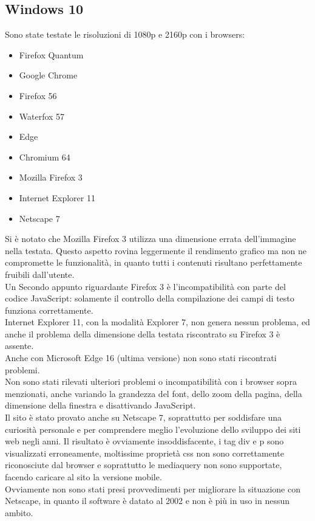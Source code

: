 \documentclass[openany, a4paper, 12pt]{report}
\begin{document}
				\subsection{Windows 10}
				Sono state testate le risoluzioni di 1080p e 2160p con i browsers:
				\begin{itemize}
					\item Firefox Quantum
					\item Google Chrome
					\item Firefox 56
					\item Waterfox 57
					\item Edge
					\item Chromium 64
					\item Mozilla Firefox 3
					\item Internet Explorer 11
					\item Netscape 7
				\end{itemize}
				Si è notato che Mozilla Firefox 3 utilizza una dimensione errata dell'immagine nella testata. Questo aspetto rovina leggermente il rendimento grafico ma non ne compromette le funzionalità, in quanto tutti i contenuti risultano perfettamente fruibili dall'utente.\\
				Un Secondo appunto riguardante Firefox 3 è l'incompatibilità con parte del codice JavaScript: solamente il controllo della compilazione dei campi di testo funziona correttamente.\\
				Internet Explorer 11, con la modalità Explorer 7, non genera nessun problema, ed anche il problema della dimensione della testata riscontrato su Firefox 3  è assente.\\
				Anche con Microsoft Edge 16 (ultima versione) non sono stati riscontrati problemi. \\
				Non sono stati rilevati ulteriori problemi o incompatibilità con i browser sopra menzionati, anche variando la grandezza del font, dello zoom della pagina, della dimensione della finestra e disattivando JavaScript.\\
				Il sito è stato provato anche su Netscape 7, soprattutto per soddisfare una curiosità personale e per comprendere meglio l'evoluzione dello sviluppo dei siti web negli anni. Il risultato è ovviamente insoddisfacente, i tag div e p sono visualizzati erroneamente, moltissime proprietà css non sono correttamente riconosciute dal browser e soprattutto le mediaquery non sono supportate, facendo caricare al sito la versione mobile.\\
				Ovviamente non sono stati presi provvedimenti per migliorare la situazione con Netscape, in quanto il software è datato al 2002 e non è più in uso in nessun ambito.
				
\end{document}
